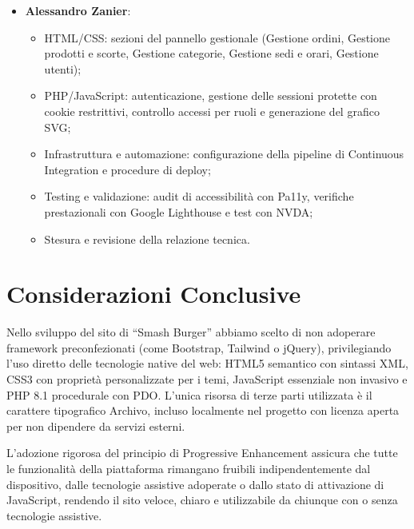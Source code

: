 \documentclass[a4paper,11pt]{article}
\begin{document}
\begin{itemize}
    \item \textbf{Alessandro Zanier}:
    \begin{itemize}
        \item HTML/CSS: sezioni del pannello gestionale (Gestione ordini, Gestione prodotti e scorte, Gestione categorie, Gestione sedi e orari, Gestione utenti);
        \item PHP/JavaScript: autenticazione, gestione delle sessioni protette con cookie restrittivi, controllo accessi per ruoli e generazione del grafico SVG;
        \item Infrastruttura e automazione: configurazione della pipeline di Continuous Integration e procedure di deploy;
        \item Testing e validazione: audit di accessibilità con Pa11y, verifiche prestazionali con Google Lighthouse e test con NVDA;
        \item Stesura e revisione della relazione tecnica.
    \end{itemize}
\end{itemize}

\section{Considerazioni Conclusive}

Nello sviluppo del sito di ``Smash Burger'' abbiamo scelto di non adoperare framework preconfezionati (come Bootstrap, Tailwind o jQuery), privilegiando l'uso diretto delle tecnologie native del web: HTML5 semantico con sintassi XML, CSS3 con proprietà personalizzate per i temi, JavaScript essenziale non invasivo e PHP 8.1 procedurale con PDO. L'unica risorsa di terze parti utilizzata è il carattere tipografico Archivo, incluso localmente nel progetto con licenza aperta per non dipendere da servizi esterni.

L'adozione rigorosa del principio di Progressive Enhancement assicura che tutte le funzionalità della piattaforma rimangano fruibili indipendentemente dal dispositivo, dalle tecnologie assistive adoperate o dallo stato di attivazione di JavaScript, rendendo il sito veloce, chiaro e utilizzabile da chiunque con o senza tecnologie assistive.
\end{document}
